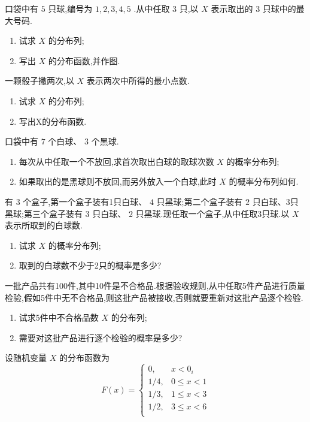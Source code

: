 \begin{xiti}
\item 口袋中有 $ 5 $ 只球,编号为 $ 1,2,3,4,5 $ .从中任取 $ 3 $ 只,以 $ X $ 表示取出的 $ 3 $ 只球中的最大号码.
\begin{enumerate}
\item 试求 $ X $ 的分布列;
\item 写出 $ X $ 的分布函数,并作图.
\end{enumerate}
\item 一颗骰子撇两次,以 $ X $ 表示两次中所得的最小点数.
\begin{enumerate}
\item 试求 $ X $ 的分布列;
\item 写出X的分布函数.
\end{enumerate}
\item 口袋中有 $ 7 $ 个白球、 $ 3 $ 个黑球.
\begin{enumerate}
\item 每次从中任取一个不放回,求首次取出白球的取球次数 $ X $ 的概率分布列;
\item 如果取出的是黑球则不放回,而另外放入一个白球,此时 $ X $ 的概率分布列如何.
\end{enumerate}
\item 有 $ 3 $ 个盒子,第一个盒子装有1只白球、 $ 4 $ 只黑球;第二个盒子装有 $ 2 $ 只白球、3只黑球;第三个盒子装有 $ 3 $ 只白球、 $ 2 $ 只黑球.现任取一个盒子,从中任取3只球.以 $ X $ 表示所取到的白球数.
\begin{enumerate}
\item 试求 $ X $ 的概率分布列;
\item 取到的白球数不少于2只的概率是多少?
\end{enumerate}
\item 一批产品共有100件,其中10件是不合格品.根据验收规则,从中任取5件产品进行质量检验,假如5件中无不合格品,则这批产品被接收,否则就要重新对这批产品逐个检验.
\begin{enumerate}
\item 试求5件中不合格品数 $ X $ 的分布列;
\item 需要对这批产品进行逐个检验的概率是多少?
\end{enumerate}
\item 设随机变量 $ X $ 的分布函数为
\[ 
F(x)=\left\{\begin{array}{ll}
{0,} & {x<0_{i}} \\ {1 / 4,} & {0 \leqslant x<1} \\ 
{1 / 3,} & {1 \leqslant x<3} \\ {1 / 2,} & {3 \leqslant x<6} \\ 

\end{array}\]
\end{xiti}
